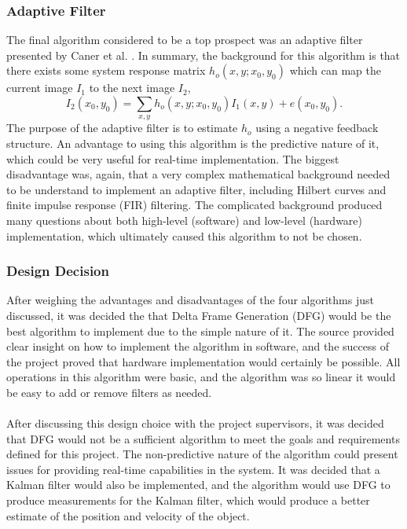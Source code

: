 \documentclass[11pt]{article} %
\begin{document}
\subsubsection{Adaptive Filter}
The final algorithm considered to be a top prospect was an adaptive filter presented by Caner et al. \cite{6}. In summary, the background for this algorithm is that there exists some system response matrix $h_o(x, y; x_0, y_0)$ which can map the current image $I_1$ to the next image $I_2$,
\[
I_2(x_0, y_0) = \sum_{x,y} h_o(x, y; x_0, y_0) I_1(x,y) + e(x_0, y_0).
\]
The purpose of the adaptive filter is to estimate $h_o$ using a negative feedback structure. An advantage to using this algorithm is the predictive nature of it, which could be very useful for real-time implementation. The biggest disadvantage was, again, that a very complex mathematical background needed to be understand to implement an adaptive filter, including Hilbert curves and finite impulse response (FIR) filtering. The complicated background produced many questions about both high-level (software) and low-level (hardware) implementation, which ultimately caused this algorithm to not be chosen.
\subsubsection{Design Decision}
After weighing the advantages and disadvantages of the four algorithms just discussed, it was decided the that Delta Frame Generation (DFG) would be the best algorithm to implement due to the simple nature of it. The source provided clear insight on how to implement the algorithm in software, and the success of the project proved that hardware implementation would certainly be possible. All operations in this algorithm were basic, and the algorithm was so linear it would be easy to add or remove filters as needed. \\\\
After discussing this design choice with the project supervisors, it was decided that DFG would not be a sufficient algorithm to meet the goals and requirements defined for this project. The non-predictive nature of the algorithm could present issues for providing real-time capabilities in the system. It was decided that a Kalman filter would also be implemented, and the algorithm would use DFG to produce measurements for the Kalman filter, which would produce a better estimate of the position and velocity of the object.
\end{document}
